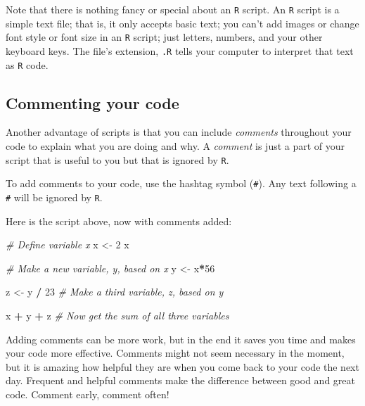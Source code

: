 \documentclass[
]{book}
\newenvironment{Shaded}{\begin{snugshade}}{\end{snugshade}}
\newcommand{\CommentTok}[1]{\textcolor[rgb]{0.56,0.35,0.01}{\textit{#1}}}
\newcommand{\DecValTok}[1]{\textcolor[rgb]{0.00,0.00,0.81}{#1}}
\newcommand{\NormalTok}[1]{#1}
\newcommand{\OperatorTok}[1]{\textcolor[rgb]{0.81,0.36,0.00}{\textbf{#1}}}
\newcommand{\StringTok}[1]{\textcolor[rgb]{0.31,0.60,0.02}{#1}}
\begin{document}
Note that there is nothing fancy or special about an \texttt{R} script. An \texttt{R} script is a simple text file; that is, it only accepts basic text; you can't add images or change font style or font size in an \texttt{R} script; just letters, numbers, and your other keyboard keys. The file's extension, \texttt{.R} tells your computer to interpret that text as \texttt{R} code.

\hypertarget{commenting-your-code}{%
\subsection*{Commenting your code}\label{commenting-your-code}}

Another advantage of scripts is that you can include \emph{comments} throughout your code to explain what you are doing and why. A \emph{comment} is just a part of your script that is useful to you but that is ignored by \texttt{R}.

To add comments to your code, use the hashtag symbol (\texttt{\#}). Any text following a \texttt{\#} will be ignored by \texttt{R}.

Here is the script above, now with comments added:

\begin{Shaded}
\begin{Highlighting}[]
\CommentTok{# Define variable x}
\NormalTok{x <-}\StringTok{ }\DecValTok{2} 
\NormalTok{x}

\CommentTok{# Make a new variable, y, based on x}
\NormalTok{y <-}\StringTok{ }\NormalTok{x}\OperatorTok{*}\DecValTok{56}

\NormalTok{z <-}\StringTok{ }\NormalTok{y }\OperatorTok{/}\StringTok{ }\DecValTok{23} \CommentTok{# Make a third variable, z, based on y}
 
\NormalTok{x }\OperatorTok{+}\StringTok{ }\NormalTok{y }\OperatorTok{+}\StringTok{ }\NormalTok{z }\CommentTok{# Now get the sum of all three variables}
\end{Highlighting}
\end{Shaded}

Adding comments can be more work, but in the end it saves you time and makes your code more effective. Comments might not seem necessary in the moment, but it is amazing how helpful they are when you come back to your code the next day. Frequent and helpful comments make the difference between good and great code. Comment early, comment often!
\end{document}
